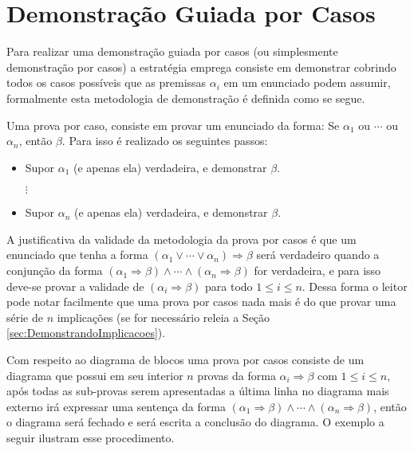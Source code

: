 \section{Demonstração Guiada por Casos}

Para realizar uma demonstração guiada por casos (ou simplesmente demonstração por casos) a estratégia emprega consiste em demonstrar cobrindo todos os casos possíveis que as premissas  $\alpha_i$ em um enunciado podem assumir, formalmente esta metodologia de demonstração é definida como se segue.

\begin{definicao}\label{metodo:PorCasos}
	Uma prova por caso, consiste em provar um enunciado da forma: Se $\alpha_1$ ou $\cdots$ ou $\alpha_n$, então $\beta$. Para isso é realizado os seguintes passos:
	\begin{itemize}
		\item Supor $\alpha_1$ (e apenas ela) verdadeira, e demonstrar $\beta$.
		
		$\vdots$
		
		\item Supor $\alpha_n$ (e apenas ela) verdadeira, e demonstrar $\beta$.
	\end{itemize}
\end{definicao}

A justificativa da validade  da metodologia da prova por casos é que um enunciado que tenha a forma $(\alpha_1 \lor \cdots \lor \alpha_n) \Rightarrow \beta$ será verdadeiro quando a conjunção da forma $(\alpha_1 \Rightarrow \beta) \land \cdots \land (\alpha_n \Rightarrow \beta)$ for verdadeira,  e para isso deve-se provar a validade de $(\alpha_i \Rightarrow \beta)$ para todo $1 \leq i \leq n$. Dessa forma o leitor pode notar facilmente que uma prova por casos nada mais é do que provar uma série de $n$ implicações (se for necessário releia a Seção \ref{sec:DemonstrandoImplicacoes}).

Com respeito ao diagrama de blocos uma prova por casos consiste de um diagrama que possui em seu interior $n$ provas da forma $\alpha_i \Rightarrow \beta$ com $1 \leq i \leq n$, após todas as sub-provas serem apresentadas a última linha no diagrama mais externo irá expressar uma sentença da forma $(\alpha_1 \Rightarrow \beta) \land \cdots \land (\alpha_n \Rightarrow \beta)$, então o diagrama será fechado e será escrita a conclusão do diagrama. O exemplo a seguir ilustram esse procedimento.

